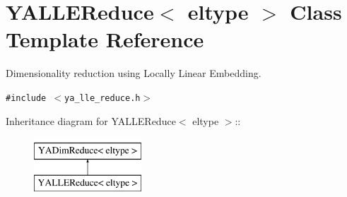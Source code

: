 \hypertarget{class_y_a_l_l_e_reduce}{
\section{YALLEReduce$<$ eltype $>$ Class Template Reference}
\label{class_y_a_l_l_e_reduce}
}
Dimensionality reduction using Locally Linear Embedding.  


{\tt \#include $<$ya\_\-lle\_\-reduce.h$>$}

Inheritance diagram for YALLEReduce$<$ eltype $>$::\begin{figure}[H]
\begin{center}
\leavevmode
\includegraphics[height=2cm]{class_y_a_l_l_e_reduce}
\end{center}
\end{figure}
